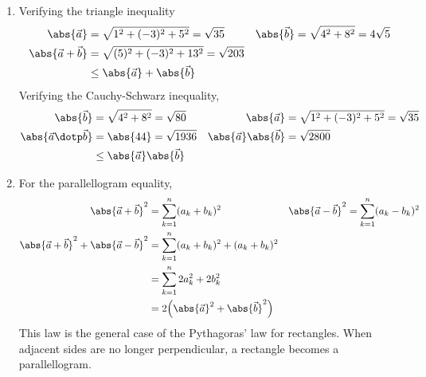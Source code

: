 \begin{enumerate}
    \item Verifying the triangle inequality
          \begin{align}
              \abs{\vec{a}}           & = \sqrt{1^2 + (-3)^2 + 5^2} = \sqrt{35} &
              \abs{\vec{b}}           & = \sqrt{4^2 + 8^2} = 4\sqrt{5}            \\
              \abs{\vec{a} + \vec{b}} &
              = \sqrt{(5)^2 + (-3)^2 + 13^2} = \sqrt{203}                         \\
                                      & \leq \abs{\vec{a}} + \abs{\vec{b}}
          \end{align}
          Verifying the Cauchy-Schwarz inequality,
          \begin{align}
              \abs{\vec{b}}               & = \sqrt{4^2 + 8^2}
              = \sqrt{80}                 &
              \abs{\vec{a}}               & = \sqrt{1^2 + (-3)^2 + 5^2}
              = \sqrt{35}                                                      \\
              \abs{\vec{a}
              \dotp \vec{b}}              & = \abs{44} = \sqrt{1936}         &
              \abs{\vec{a}} \abs{\vec{b}} & = \sqrt{2800}                      \\
                                          & \leq \abs{\vec{a}} \abs{\vec{b}}
          \end{align}

    \item For the parallellogram equality,
          \begin{align}
              \abs{\vec{a} + \vec{b}}^2                             &
              = \sum_{k=1}^{n} (a_k + b_k)^2                        &
              \abs{\vec{a} - \vec{b}}^2                             &
              = \sum_{k=1}^{n} (a_k - b_k)^2                          \\
              \abs{\vec{a} + \vec{b}}^2 + \abs{\vec{a} - \vec{b}}^2 &
              = \sum_{k=1}^{n} (a_k + b_k)^2 + (a_k + b_k)^2          \\
                                                                    &
              = \sum_{k=1}^{n} 2a_k^2 + 2b_k^2                        \\
                                                                    &
              = 2\Big( \abs{\vec{a}}^2 + \abs{\vec{b}}^2 \Big)
          \end{align}
          This law is the general case of the Pythagoras' law for rectangles. When
          adjacent sides are no longer perpendicular, a rectangle becomes a
          parallellogram.


\end{enumerate}
